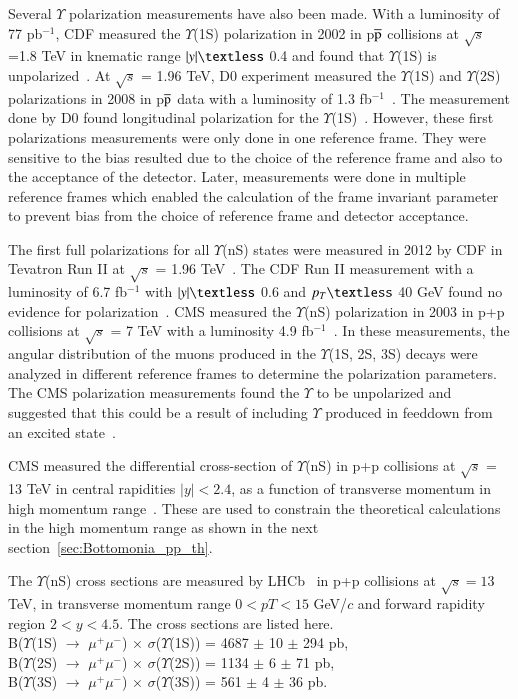 Several $\Upsilon$ polarization measurements have also been made. With a luminosity
of 77 pb$^{-1}$, CDF measured the $\Upsilon$(1S) polarization in 2002 in 
p$\overline{\rm p}$ collisions at $\surd s$ =1.8 TeV in knematic range
$|y|\textless$ 0.4 and found that $\Upsilon$(1S) is unpolarized~\cite{CDF:2001fdy}.
At $\surd s$  = 1.96 TeV, D0 experiment measured the $\Upsilon$(1S) and
$\Upsilon$(2S) polarizations in 2008 in p$\overline{\rm p}$ data
with a luminosity of 1.3 fb$^{-1}$~\cite{D0:2008yos}. The measurement done by D0 found
longitudinal polarization for the $\Upsilon$(1S)~\cite{D0:2008yos}.
However, these first polarizations measurements were only done in one reference frame.
They were sensitive to the bias resulted due to the choice of the reference frame
and also to the acceptance of the detector. Later, measurements were done in multiple
reference frames which enabled the calculation of the frame invariant parameter to
prevent bias from the choice of reference frame and 
detector acceptance.


The first full polarizations for all $\Upsilon$(nS) states were measured in 2012 by
CDF in Tevatron Run II at $\surd s$  = 1.96 TeV~\cite{CDF:2011ag}.
The CDF Run II measurement with a luminosity of 6.7 fb$^{-1}$
with $|y|\textless$ 0.6 and $p_{T}\textless$ 40 GeV found no evidence for
polarization~\cite{CDF:2011ag}.
CMS measured the $\Upsilon$(nS) polarization in 2003 in p+p collisions
at $\surd s$  = 7 TeV with a luminosity 4.9 fb$^{-1}$~\cite{CMS:2012bpf}.
In these measurements, the angular distribution of the muons produced in
the $\Upsilon$(1S, 2S, 3S)
decays were analyzed in different reference frames to determine the
polarization parameters.
The CMS polarization measurements found the $\Upsilon$
to be unpolarized and suggested that this could be a result of including
$\Upsilon$ produced in feeddown from an excited state~\cite{CMS:2012bpf}.

CMS measured the differential cross-section of $\Upsilon$(nS)
in p+p collisions at $\sqrt{s}$ = 13 TeV in central rapidities $|y|<2.4$,
as a function of transverse momentum in high momentum range~\cite{CMS:2017dju}.
These are used to constrain the theoretical calculations in the high
momentum range as shown in the next section~\ref{sec:Bottomonia_pp_th}.

The $\Upsilon$(nS) cross sections are measured by LHCb~\cite{LHCb:2018yzj}
in p+p collisions at $\sqrt{s}=13$ TeV, in transverse momentum
range $0 < pT < 15$ GeV/$c$ and forward rapidity region $2 < y < 4.5$.
The cross sections are listed here. \\
B($\Upsilon$(1S) $\rightarrow$ $\mu^+\mu^-$) $\times$ $\sigma$($\Upsilon$(1S)) = 4687 $\pm$ 10 $\pm$ 294 pb,\\
B($\Upsilon$(2S) $\rightarrow$ $\mu^+\mu^-$) $\times$ $\sigma$($\Upsilon$(2S)) = 1134 $\pm$ 6 $\pm$ 71 pb, \\
B($\Upsilon$(3S) $\rightarrow$ $\mu^+\mu^-$) $\times$ $\sigma$($\Upsilon$(3S)) = 561 $\pm$ 4 $\pm$ 36 pb. 


